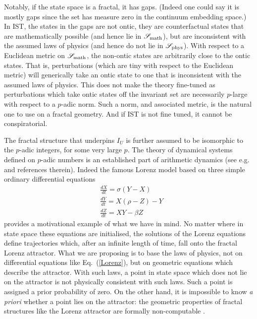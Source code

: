 \documentclass[12pt]{article}
\begin{document}
Notably, if the state space is a fractal, it has gaps. (Indeed one could say it is mostly gaps since the set has measure zero in the continuum embedding space.) In {\sc IST}, the states in the gaps are not ontic, they are counterfactual states that are mathematically possible (and hence lie in ${\mathscr S}_{\rm math}$), but are inconsistent with the assumed laws of physics (and hence do not lie in ${\mathscr S}_{\rm phys}$). With respect to a Euclidean metric on ${\mathscr S}_{\rm math}$, the non-ontic states are arbitrarily close to the ontic states. That is, perturbations (which are tiny with respect to the Euclidean metric) will generically take an ontic state to one that is inconsistent with the assumed laws of physics. This does not make the theory fine-tuned as perturbations which take ontic states off the invariant set are necessarily $p$-large with respect to a $p$-adic norm. Such a norm, and associated metric, is the natural one to use on a fractal geometry. And if {\rm IST} is not fine tuned, it cannot be conspiratorial. 

The fractal structure that underpins $I_U$ is further assumed to be isomorphic to the $p$-adic integers, for some very large $p$. The theory of dynamical systems defined on $p$-adic numbers is an established part of arithmetic dynamics (see e.g. \cite{Woodcock1998padic} and references therein).
Indeed the famous Lorenz model based on three simple ordinary differential equations
\begin{equation}\label{Lorenz}
\begin{split}
&\frac{dX}{dt} = \sigma(Y-X) \\
&\frac{dY}{dt} = X(\rho -Z) -Y\\
&\frac{dZ}{dt} = XY - \beta Z
\end{split}
\end{equation}
provides a motivational example of what we have in mind. No matter where in state space these equations are initialised, the solutions of the Lorenz equations define trajectories which, after an infinite length of time, fall onto the fractal Lorenz attractor. What we are proposing is to base the laws of physics, not on differential equations like Eq.\ (\mbox{\ref{Lorenz}}), but on geometric equations which describe the attractor. With such laws, a point in state space which does not lie on the attractor is not physically consistent with such laws. Such a point is assigned a prior probability of zero. On the other hand, it is impossible to know \textit{a priori} whether a point lies on the attractor: the geometric properties of fractal structures like the Lorenz attractor are formally non-computable \mbox{\cite{blum1998complexity,Dube1993Fractal}}.
\end{document}
